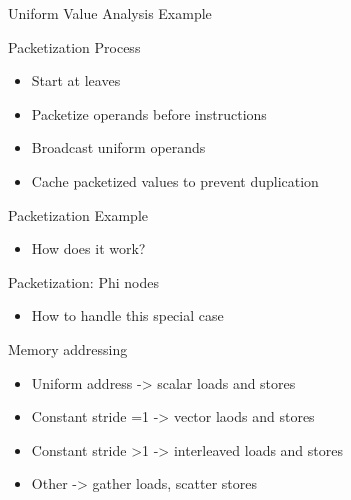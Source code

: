 
\begin{frame}{Uniform Value Analysis Example}


\end{frame}


\begin{frame}{Packetization Process}

\begin{itemize}
    \item Start at leaves
    \item Packetize operands before instructions
    \item Broadcast uniform operands
    \item Cache packetized values to prevent duplication
\end{itemize}

\end{frame}


\begin{frame}{Packetization Example}

\begin{itemize}
    \item How does it work?
\end{itemize}

\end{frame}


\begin{frame}{Packetization: Phi nodes}

\begin{itemize}
    \item How to handle this special case
\end{itemize}

\end{frame}


\begin{frame}{Memory addressing}

\begin{itemize}
    \item Uniform address -> scalar loads and stores
    \item Constant stride =1 -> vector laods and stores
    \item Constant stride >1 -> interleaved loads and stores
    \item Other -> gather loads, scatter stores
\end{itemize}


\end{frame}

